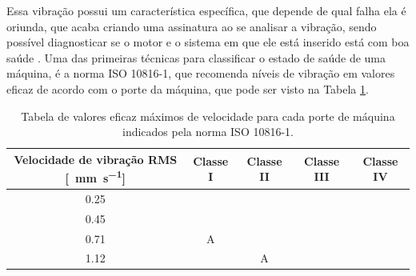 Essa vibração possui um característica específica, que depende de qual falha ela é oriunda, que acaba criando uma assinatura
ao se analisar a vibração, sendo possível diagnosticar se o motor e o sistema em que ele está inserido está com boa saúde \cite{Wu2013}.
Uma das primeiras técnicas para classificar o estado de saúde de uma máquina, é a norma ISO 10816-1, que recomenda níveis de vibração 
em valores eficaz de acordo com o porte da máquina, que pode ser visto na Tabela \ref{tab:iso10816-1_randall_p146}.

\begin{table}[H]
    \caption{Tabela de valores eficaz máximos de velocidade para cada porte de máquina indicados pela norma ISO 10816-1.}
    \label{tab:iso10816-1_randall_p146}
    \centering%
    \begin{minipage}{.9\textwidth}
        \begin{tabular*}{\textwidth}{|c|c|c|c|c|}
            \hline
            \multicolumn{1}{|c|}{Velocidade de vibração RMS [\SI{}{\milli\metre\per\second}] }& Classe I                                                         & Classe II                                                        & Classe III                                                       & Classe IV                                                        \\ \hline
            \multicolumn{1}{|c|}{0.25}            & \multicolumn{1}{c|}{\cellcolor[HTML]{00FF02}}                    & \multicolumn{1}{c|}{\cellcolor[HTML]{00FF02}}                    & \multicolumn{1}{c|}{\cellcolor[HTML]{00FF02}}                    & \multicolumn{1}{c|}{\cellcolor[HTML]{00FF02}}                    \\ \cline{1-1}
            \multicolumn{1}{|c|}{0.45}            & \multicolumn{1}{c|}{\cellcolor[HTML]{00FF02}}                    & \multicolumn{1}{c|}{\cellcolor[HTML]{00FF02}}                    & \multicolumn{1}{c|}{\cellcolor[HTML]{00FF02}}                    & \multicolumn{1}{c|}{\cellcolor[HTML]{00FF02}}                    \\ \cline{1-1}
            \multicolumn{1}{|c|}{0.71}            & \multicolumn{1}{c|}{\multirow{-3}{*}{\cellcolor[HTML]{00FF02}A}} & \multicolumn{1}{c|}{\cellcolor[HTML]{00FF02}}                    & \multicolumn{1}{c|}{\cellcolor[HTML]{00FF02}}                    & \multicolumn{1}{c|}{\cellcolor[HTML]{00FF02}}                    \\ \cline{1-2}
            \multicolumn{1}{|c|}{1.12}            & \multicolumn{1}{c|}{\cellcolor[HTML]{00D2CB}}                    & \multicolumn{1}{c|}{\multirow{-4}{*}{\cellcolor[HTML]{00FF02}A}} & \multicolumn{1}{c|}{\cellcolor[HTML]{00FF02}}                    & \multicolumn{1}{c|}{\cellcolor[HTML]{00FF02}}                    \\ \cline{1-1} \cline{3-3}

\end{tabular*}
\end{minipage}
\end{table}
